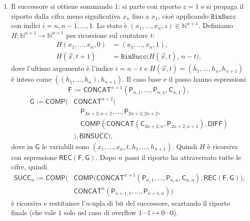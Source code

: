 \begin{sol}
\begin{enumerate}
Per ottenere la funzione voluta, definita su $\mathbb N^{n+2}$, ricodifichiamo la tupla con
\[
\begin{aligned}
\mathsf{ACCA}:=\mathsf{CONCAT}^3\Big(&\mathsf{COMP}(\mathsf{CONCAT}^n(\mathsf P_{n+2,1},\dots,\mathsf P_{n+2,n}),\mathsf K_n),\\
&\mathsf P_{n+2,n+1},\mathsf P_{n+2,n+2}\Big)
\end{aligned}
\]
e poniamo
\[
\begin{aligned}
\mathsf{BINSUCC}:=\mathsf{CONCAT}\Big(&\mathsf{COMP}(\mathsf{COMP}(\mathsf{ACCA},\mathsf{APP}_h),\mathsf{KINV}_n),\\
&\mathsf{COMP}(\mathsf{ACCA},\mathsf{SIGMA})\Big):\mathbb N^{n+2}\to\mathbb N^{n+1}.
\end{aligned}
\]
\item Il successore si ottiene sommando $1$: si parte con riporto $z=1$ e si propaga il riporto dalla cifra meno significativa $x_n$ fino a $x_1$, cioè applicando $\texttt{BinSucc}$ con indici $i=n,n-1,\dots,1$. Lo stato è $(x_1,\dots,x_n,z)\in\mathbb N^{n+1}$. Definiamo $H:\mathbb N^{n+1}\to\mathbb N^{n+1}$ per ricorsione sul contatore $t$:
\[
\begin{aligned}
H(x_1,\dots,x_n,0)&=(x_1,\dots,x_n,1),\\
H(\vec x,t+1)&=\texttt{BinSucc}\big(H(\vec x,t),\,n-t\big),
\end{aligned}
\]
dove l'ultimo argomento è l'indice $i=n-t$ e $H(\vec x,t)=(h_1,\dots,h_n,h_{n+1})$ è inteso come $((h_1,\dots,h_n),h_{n+1})$. Il caso base e il passo hanno espressioni
\[
\mathsf F:=\mathsf{CONCAT}^{n+1}(\mathsf P_{n,1},\dots,\mathsf P_{n,n},\mathsf C_{n,1}),
\]
\[
\begin{aligned}
\mathsf G:=\mathsf{COMP}\Big(&\mathsf{CONCAT}^{n+2}\big(\\
&\quad\mathsf P_{2n+2,n+2},\dots,\mathsf P_{2n+2,2n+2},\\
&\quad\mathsf{COMP}(\mathsf{CONCAT}(\mathsf C_{2n+2,n},\mathsf P_{2n+2,n+1}),\mathsf{DIFF})\\
&\big),\mathsf{BINSUCC}\Big),
\end{aligned}
\]
dove in $\mathsf G$ le variabili sono $(x_1,\dots,x_n,t,h_1,\dots,h_{n+1})$. Quindi $H$ è ricorsiva con espressione $\mathsf{REC}(\mathsf F,\mathsf G)$. Dopo $n$ passi il riporto ha attraversato tutte le cifre, quindi
\[
\begin{aligned}
\mathsf{SUCC}_n:=\mathsf{COMP}\Big(&\mathsf{COMP}\big(\mathsf{CONCAT}^{n+1}(\mathsf P_{n,1},\dots,\mathsf P_{n,n},\mathsf C_{n,n}),\mathsf{REC}(\mathsf F,\mathsf G)\big),\\
&\mathsf{CONCAT}^n(\mathsf P_{n+1,1},\dots,\mathsf P_{n+1,n})\Big)
\end{aligned}
\]
è ricorsiva e restituisce l'$n$-upla di bit del successore, scartando il riporto finale (che vale $1$ solo nel caso di overflow $1\cdots1\mapsto0\cdots0$).


\end{enumerate}
\end{sol}
